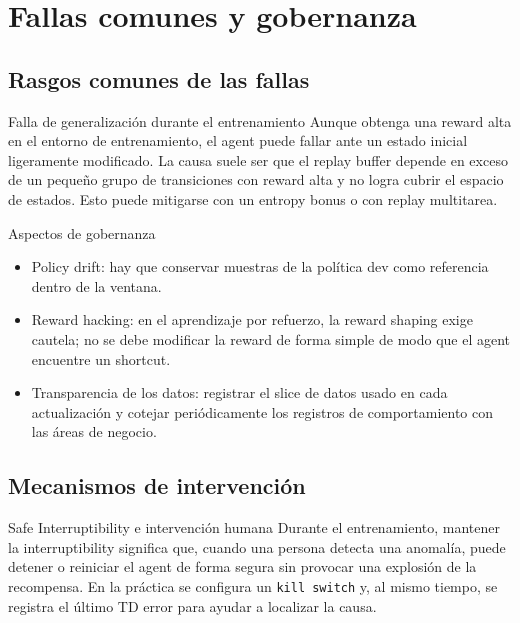 \section{Fallas comunes y gobernanza}

\subsection{Rasgos comunes de las fallas}

\begin{warningbox}{Falla de generalización durante el entrenamiento}
Aunque obtenga una reward alta en el entorno de entrenamiento, el agent puede fallar ante un estado inicial ligeramente modificado. La causa suele ser que el replay buffer depende en exceso de un pequeño grupo de transiciones con reward alta y no logra cubrir el espacio de estados. Esto puede mitigarse con un entropy bonus o con replay multitarea.
\end{warningbox}

\begin{knowledgebox}{Aspectos de gobernanza}
\begin{itemize}
    \item Policy drift: hay que conservar muestras de la política dev como referencia dentro de la ventana.
    \item Reward hacking: en el aprendizaje por refuerzo, la reward shaping exige cautela; no se debe modificar la reward de forma simple de modo que el agent encuentre un shortcut.
    \item Transparencia de los datos: registrar el slice de datos usado en cada actualización y cotejar periódicamente los registros de comportamiento con las áreas de negocio.
\end{itemize}
\end{knowledgebox}

\subsection{Mecanismos de intervención}

\begin{importantbox}{Safe Interruptibility e intervención humana}
Durante el entrenamiento, mantener la interruptibility significa que, cuando una persona detecta una anomalía, puede detener o reiniciar el agent de forma segura sin provocar una explosión de la recompensa. En la práctica se configura un \texttt{kill switch} y, al mismo tiempo, se registra el último TD error para ayudar a localizar la causa.
\end{importantbox}

